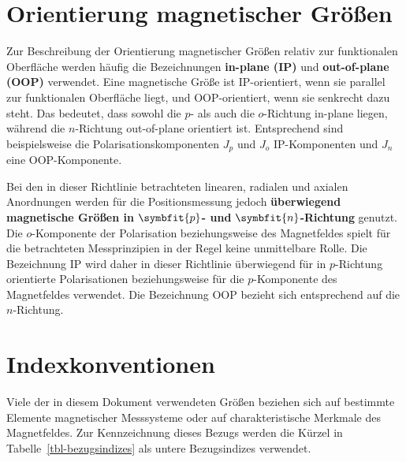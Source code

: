 \documentclass[
  ngerman,
  a4paper,
  twoside]{scrbook}
\begin{document}
\section{Orientierung magnetischer
Größen}\label{sec-03-orientierung_magnetischer_groessen}

Zur Beschreibung der Orientierung magnetischer Größen relativ zur
funktionalen Oberfläche werden häufig die Bezeichnungen \textbf{in-plane
(IP)} und \textbf{out-of-plane (OOP)} verwendet. Eine magnetische Größe
ist IP-orientiert, wenn sie parallel zur funktionalen Oberfläche liegt,
und OOP-orientiert, wenn sie senkrecht dazu steht. Das bedeutet, dass
sowohl die \(p\)- als auch die \(o\)-Richtung in-plane liegen, während
die \(n\)-Richtung out-of-plane orientiert ist. Entsprechend sind
beispielsweise die Polarisationskomponenten \(J_p\) und \(J_o\)
IP-Komponenten und \(J_n\) eine OOP-Komponente.

Bei den in dieser Richtlinie betrachteten linearen, radialen und axialen
Anordnungen werden für die Positionsmessung jedoch \textbf{überwiegend
magnetische Größen in} \(\symbfit{p}\)\textbf{- und}
\(\symbfit{n}\)\textbf{-Richtung} genutzt. Die \(o\)-Komponente der
Polarisation beziehungsweise des Magnetfeldes spielt für die
betrachteten Messprinzipien in der Regel keine unmittelbare Rolle. Die
Bezeichnung IP wird daher in dieser Richtlinie überwiegend für in
\(p\)-Richtung orientierte Polarisationen beziehungsweise für die
\(p\)-Komponente des Magnetfeldes verwendet. Die Bezeichnung OOP bezieht
sich entsprechend auf die \(n\)-Richtung.

\section{Indexkonventionen}\label{sec-03-indexkonvention}

Viele der in diesem Dokument verwendeten Größen beziehen sich auf
bestimmte Elemente magnetischer Messsysteme oder auf charakteristische
Merkmale des Magnetfeldes. Zur Kennzeichnung dieses Bezugs werden die
Kürzel in Tabelle~\ref{tbl-bezugsindizes} als untere Bezugsindizes
verwendet.
\end{document}
